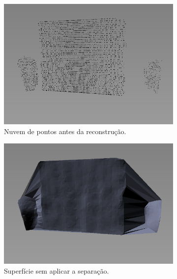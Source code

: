 \begin{figure}[H]
    \centering
    \begin{subfigure}[t]{0.4\textwidth}
        \includegraphics[width=\textwidth]{dados/figuras/split_mesh1.png}
        \caption{Nuvem de pontos antes da reconstrução.}
        \label{fig:split_mesh1}
    \end{subfigure}
    \begin{subfigure}[t]{0.4\textwidth}
        \includegraphics[width=\textwidth]{dados/figuras/split_mesh2.png}
        \caption{Superfície sem aplicar a separação.}
        \label{fig:split_mesh2}
    \end{subfigure}
    \begin{subfigure}[t]{0.4\textwidth}

\end{subfigure}
\end{figure}
